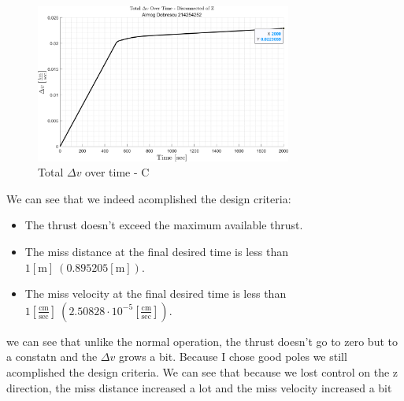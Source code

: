 \documentclass[11pt, a4paper]{article}
\begin{document}
\begin{figure}[H]
    \centering
    \includegraphics[width=0.75\textwidth]{images/graph8.png}
    \caption{Total $\Delta v$ over time - C}
    \label{fig:delta_v_over_time-caseC}
\end{figure}
We can see that we indeed acomplished the design criteria:
\begin{itemize}
    \item The thrust doesn't exceed the maximum available thrust.
    \item The miss distance at the final desired time is less than $1[\mathrm{m}]\ \left(0.895205\left[\mathrm{m}\right]\right)$.
    \item The miss velocity at the final desired time is less than $1\left[\displaystyle\frac{\mathrm{cm}}{\mathrm{sec}}\right]\ \left(2.50828\cdot10^{-5}\left[\displaystyle\frac{\mathrm{cm}}{\mathrm{sec}}\right]\right)$.
\end{itemize}

we can see that unlike the normal operation, the thrust doesn't go to zero but to a constatn and the $\Delta v$ grows a bit. Because I chose good poles we still acomplished the design criteria. We can see that because we lost control on the z direction, the miss distance increased a lot and the miss velocity increased a bit
\end{document}
